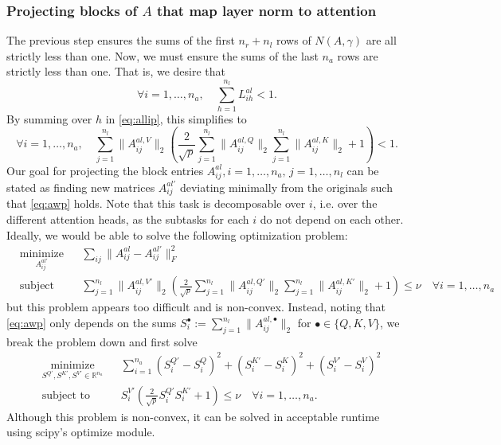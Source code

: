 \documentclass{article}
\begin{document}
\subsubsection{Projecting blocks of \texorpdfstring{$A$}{} that map layer norm to attention}
The previous step ensures the sums of the first $n_r + n_l$ rows of $N(A, \gamma)$
are all strictly less than one. Now, we must ensure the sums of the last $n_a$ rows
are strictly less than one. That is, we desire that 
\begin{equation*}
\forall i=1,\ldots, n_a,\quad  \sum_{h=1}^{n_l} L^{al}_{ih} < 1.
\end{equation*}
By summing over $h$ in \eqref{eq:allip}, this simplifies to 
\begin{equation}
\forall i=1,\ldots, n_a,\quad
\sum_{j=1}^{n_l} \|A^{al, V}_{ij}\|_2 \left(\frac2{\sqrt p}\sum_{j=1}^{n_l} \|A^{al, Q}_{ij}\|_2\sum_{j=1}^{n_l}
\|A^{al, K}_{ij}\|_2 + 1\right) < 1. \label{eq:awp}
\end{equation}
Our goal for projecting the block entries $A^{al}_{ij}, i=1,\ldots, n_a,\, j=1,\ldots, n_l$ can be stated as 
finding new matrices $A^{al\prime}_{ij}$ deviating minimally from the originals such that \eqref{eq:awp} holds.
Note that this task is decomposable over $i$, i.e. over the different attention heads, as the subtasks for 
each $i$ do not depend on each other. Ideally, we would be able to solve the following optimization problem:
\begin{equation*}
  \begin{aligned}
    &\underset{A^{al\prime}_{ij}}{\text{minimize}} && \sum_{ij} \|A^{al}_{ij} - A^{al\prime}_{ij}\|_F^2 \\
    &\text{subject to} && \sum_{j=1}^{n_l} \|A^{al, V\prime}_{ij}\|_2 \left(\frac2{\sqrt p}\sum_{j=1}^{n_l} \|A^{al, Q\prime}_{ij}\|_2\sum_{j=1}^{n_l}
\|A^{al, K\prime}_{ij}\|_2 + 1\right) \leq \nu \quad \forall i=1,\ldots, n_a
  \end{aligned}
\end{equation*}
but this problem appears too difficult and is non-convex. Instead, noting that \eqref{eq:awp} only depends on the
sums $S^{\bullet}_i := \sum_{j=1}^{n_l}\|A^{al, \bullet}_{ij}\|_2$ for $\bullet \in\{Q, K, V\}$, we break the problem down and
first solve
\begin{equation*}
  \begin{aligned}
    &\underset{S^{Q\prime}, S^{K\prime}, S^{V\prime}\in\mathbb R^{n_a}}{\text{minimize}} && \sum_{i=1}^{n_a}
    \left(S^{Q\prime}_i - S^Q_i\right)^2 +
    \left(S^{K\prime}_i - S^K_i\right)^2 +
    \left(S^{V\prime}_i - S^V_i\right)^2 \\
    &\text{subject to} && S^{V\prime}_i\left(\frac2{\sqrt p}S^{Q\prime}_iS^{K\prime}_i + 1\right) \leq \nu\quad \forall i=1,\ldots, n_a.
  \end{aligned}
\end{equation*}
Although this problem is non-convex, it can be solved in acceptable runtime using scipy's optimize module.
\end{document}
